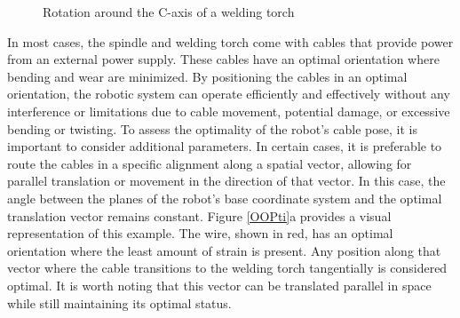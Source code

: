 \begin{figure}[H]%
	\centering
	\qquad
	\caption{Rotation around the C-axis of a welding torch }%
	\label{rot}%
\end{figure}

In most cases, the spindle and welding torch come with cables that provide power from an external power supply. These cables have an optimal orientation where bending and wear are minimized. By positioning the cables in an optimal orientation, the robotic system can operate efficiently and effectively without any interference or limitations due to cable movement, potential damage, or excessive bending or twisting. To assess the optimality of the robot's cable pose, it is important to consider additional parameters. In certain cases, it is preferable to route the cables in a specific alignment along a spatial vector, allowing for parallel translation or movement in the direction of that vector. In this case, the angle between the planes of the robot's base coordinate system and the optimal translation vector remains constant. Figure \ref{OOPti}a provides a visual representation of this example. The wire, shown in red, has an optimal orientation where the least amount of strain is present. Any position along that vector where the cable transitions to the welding torch tangentially is considered optimal. It is worth noting that this vector can be translated parallel in space while still maintaining its optimal status.

